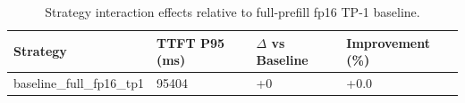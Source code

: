 \begin{table}
\caption{Strategy interaction effects relative to full-prefill fp16 TP-1 baseline.}
\label{tab:interactions}
\begin{tabular}{llll}
\toprule
Strategy & TTFT P95 (ms) & $\Delta$ vs Baseline & Improvement (\%) \\
\midrule
baseline\_full\_fp16\_tp1 & 95404 & +0 & +0.0 \\
\bottomrule
\end{tabular}
\end{table}
